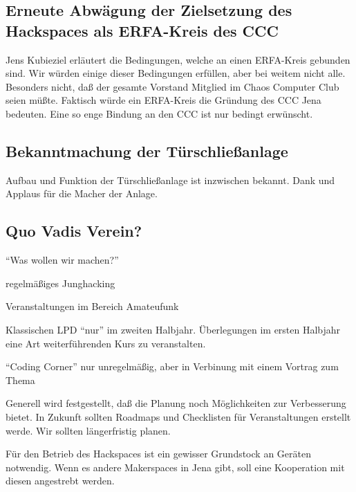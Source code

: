 \documentclass[]{scrartcl}
\newenvironment{packed_item}{
\begin{itemize}
\setlength{\itemsep}{-5pt}
\setlength{\parsep}{0pt}
}{\end{itemize}}
\newcommand{\qbi}{Jens Kubieziel}
\begin{document}
\begin{multicols}{2}
\subsection{Erneute Abwägung der Zielsetzung des Hackspaces als ERFA-Kreis des
CCC}
\qbi{} erläutert die Bedingungen, welche an einen ERFA-Kreis gebunden sind. Wir
würden einige dieser Bedingungen erfüllen, aber bei weitem nicht alle.
Besonders nicht, daß der gesamte Vorstand Mitglied im Chaos Computer Club seien
müßte. Faktisch würde ein ERFA-Kreis die Gründung des CCC Jena bedeuten.
Eine so enge Bindung an den CCC ist nur bedingt erwünscht.

\subsection{Bekanntmachung der Türschließanlage}
Aufbau und Funktion der Türschließanlage ist inzwischen bekannt. Dank und
Applaus für die Macher der Anlage.
    
\subsection{Quo Vadis Verein?}
\enquote{Was wollen wir machen?}
\begin{packed_item}
\item regelmäßiges Junghacking
\item Veranstaltungen im Bereich Amateufunk
\item Klassischen LPD \enquote{nur} im zweiten Halbjahr. Überlegungen im ersten
Halbjahr eine Art weiterführenden Kurs zu veranstalten.
\item \enquote{Coding Corner} nur unregelmäßig, aber in Verbinung mit
einem Vortrag zum Thema
\end{packed_item}
Generell wird festgestellt, daß die Planung noch Möglichkeiten zur
Verbesserung bietet. In Zukunft sollten Roadmaps und Checklisten für
Veranstaltungen erstellt werde. Wir sollten längerfristig planen.

Für den Betrieb des Hackspaces ist ein gewisser Grundstock an Geräten
notwendig. Wenn es andere Makerspaces in Jena gibt, soll eine Kooperation
mit diesen angestrebt werden.


\end{multicols}
\end{document}
